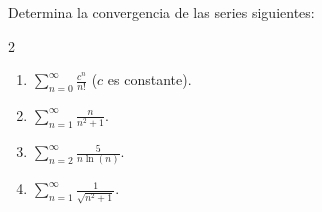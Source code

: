 \documentclass[12pt,a4paper]{article}
\begin{document}
    \begin{mdframed}[style=mdpinkbox,frametitle={Ejercicio 4}]
        Determina la convergencia de las series siguientes:
        \begin{multicols}{2}
            \begin{enumerate}
                \item[(a)] $\sum_{n=0}^{\infty}\frac{c^{n}}{n!}$ ($c$ es constante).
                \item[(b)] $\sum_{n=1}^{\infty}\frac{n}{n^{2}+1}$.
                \item[(c)] $\sum_{n=2}^{\infty}\frac{5}{n\ln(n)}$.
                \item[(d)] $\sum_{n=1}^{\infty}\frac{1}{\sqrt{n^{2}+1}}$.   
            \end{enumerate}
        \end{multicols}
    \end{mdframed}
\end{document}
